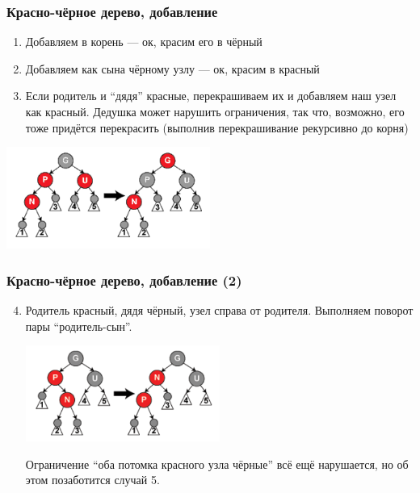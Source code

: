 \documentclass{../../slides-style}
\begin{document}
    \begin{frame}
        \frametitle{Красно-чёрное дерево, добавление}
        \begin{enumerate}
            \item Добавляем в корень --- ок, красим его в чёрный
            \item Добавляем как сына чёрному узлу --- ок, красим в красный
            \item Если родитель и ``дядя'' красные, перекрашиваем их и добавляем наш узел как красный. Дедушка может нарушить ограничения, так что, возможно, его тоже придётся перекрасить (выполнив перекрашивание рекурсивно до корня)
        \end{enumerate}
        \begin{center}
            \includegraphics[width=0.5\textwidth]{addition-to-red-black-tree.png}
        \end{center}
    \end{frame}

    \begin{frame}
        \frametitle{Красно-чёрное дерево, добавление (2)}
        \begin{enumerate}
            \setcounter{enumi}{3}
            \item Родитель красный, дядя чёрный, узел справа от родителя. Выполняем поворот пары ``родитель-сын''.
            \begin{center}
                \includegraphics[width=0.5\textwidth]{addition-to-red-black-tree2.png}
            \end{center}
            Ограничение ``оба потомка красного узла чёрные'' всё ещё нарушается, но об этом позаботится случай 5.
        \end{enumerate}
    \end{frame}
\end{document}
